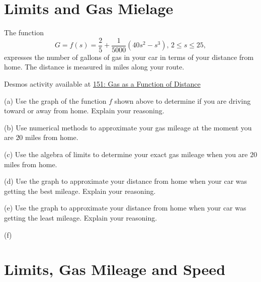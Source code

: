 \documentclass{ximera}
\begin{document}
\section{Limits and Gas Mielage}
\begin{example} \label{Ex:9sd8gfs}
The function 
\[
   G = f(s) = \frac{2}{5} +\frac{1}{5000}(40s^2 - s^3) , \, 2\leq s \leq 25 ,
\]
expresses the number of gallons of gas in your car in terms of your distance from home. The distance is measured in miles along your route. 

\begin{onlineOnly}
    \begin{center}
\end{center}
\end{onlineOnly}

Desmos activity available at
\href{https://www.desmos.com/calculator/e2uxt3o4sr}{151: Gas as a Function of Distance}


(a) Use the graph of the function $f$ shown above to determine if you are driving toward or away from home. Explain your reasoning.

(b) Use numerical methods to approximate your gas mileage at the moment you are $20$ miles from home.

(c) Use the algebra of limits to determine your exact gas mileage when you are $20$ miles from home.

(d) Use the graph to approximate your distance from home when your car was getting the best mileage. Explain your reasoning. 

(e) Use the graph to approximate your distance from home when your car was getting the least mileage. Explain your reasoning. 

(f) 

\end{example}



\section{Limits, Gas Mileage and Speed}
\end{document}
